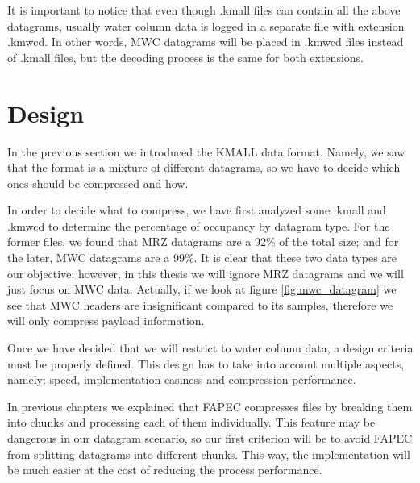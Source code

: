 It is important to notice that even though .kmall files can contain all the above datagrams, usually water column data is logged in a separate file with extension .kmwcd. In other words, MWC datagrams will be placed in .kmwcd files instead of .kmall files, but the decoding process is the same for both extensions.

\section{Design}

In the previous section we introduced the KMALL data format. Namely, we saw that the format is a mixture of different datagrams, so we have to decide which ones should be compressed and how.

In order to decide what to compress, we have first analyzed some .kmall and .kmwcd to determine the percentage of occupancy by datagram type. For the former files, we found that MRZ datagrams are a 92\% of the total size; and for the later, MWC datagrams are a 99\%. It is clear that these two data types are our objective; however, in this thesis we will ignore MRZ datagrams and we will just focus on MWC data. Actually, if we look at figure \ref{fig:mwc_datagram} we see that MWC headers are insignificant compared to its samples, therefore we will only compress payload information.

Once we have decided that we will restrict to water column data, a design criteria must be properly defined. This design has to take into account multiple aspects, namely: speed, implementation easiness and compression performance.

In previous chapters we explained that FAPEC compresses files by breaking them into chunks and processing each of them individually. This feature may be dangerous in our datagram scenario, so our first criterion will be to avoid FAPEC from splitting datagrams into different chunks. This way, the implementation will be much easier at the cost of reducing the process performance.

